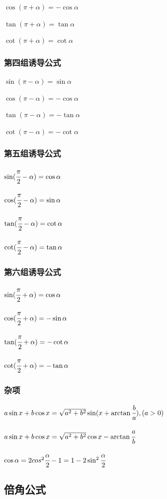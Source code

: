 \documentclass[UTF8,12pt]{ctexbook}
\begin{document}
{{{{    $\cos(\pi + \alpha) = -\cos\alpha$

    $\tan(\pi + \alpha) = \tan\alpha$

    $\cot(\pi + \alpha) = \cot\alpha$
  }%

  \subsubsection{第四组诱导公式}{
    $\sin(\pi - \alpha) = \sin\alpha$

    $\cos(\pi - \alpha) = -\cos\alpha$

    $\tan(\pi - \alpha) = -\tan\alpha$

    $\cot(\pi - \alpha) = -\cot\alpha$
  }%

  \subsubsection{第五组诱导公式}{
    $\sin(\cfrac{\pi}{2} - \alpha) = \cos\alpha$

    $\cos(\cfrac{\pi}{2} - \alpha) = \sin\alpha$

    $\tan(\cfrac{\pi}{2} - \alpha) = \cot\alpha$

    $\cot(\cfrac{\pi}{2} - \alpha) = \tan\alpha$
  }%

  \subsubsection{第六组诱导公式}{
    $\sin(\cfrac{\pi}{2} + \alpha) = \cos\alpha$

    $\cos(\cfrac{\pi}{2} + \alpha) = -\sin\alpha$

    $\tan(\cfrac{\pi}{2} + \alpha) = -\cot\alpha$

    $\cot(\cfrac{\pi}{2} + \alpha) = -\tan\alpha$
  }%

  \subsubsection{杂项}{
    $a\sin x + b\cos x = \sqrt{a^2 + b^2}\sin(x + \arctan\cfrac{b}{a}),(a > 0)$

    $a\sin x + b\cos x = \sqrt{a^2 + b^2}\cos x - \arctan\cfrac{a}{b}$

    $\cos\alpha = 2cos^2\cfrac{\alpha}{2} - 1 = 1-2\sin^2\cfrac{\alpha}{2}$
  }%

}%

\subsection{倍角公式}{

}}}
\end{document}
